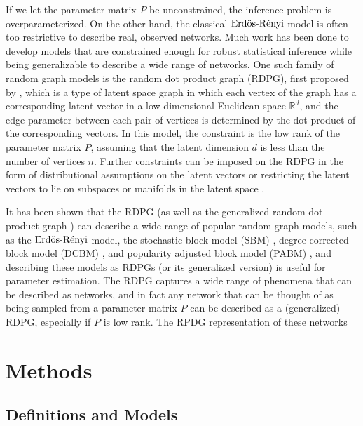 \documentclass[12pt]{article}
\begin{document}
If we let the parameter matrix \(P\) be unconstrained, the inference
problem is overparameterized. On the other hand, the classical \(\text{Erd\"{o}s-R\'{e}nyi}\)
model is often too restrictive to describe real, observed networks. Much
work has been done to develop models that are constrained enough for
robust statistical inference while being generalizable to describe a
wide range of networks. One such family of random graph models is the
random dot product graph (RDPG), first proposed by
\citet{10.1007/978-3-540-77004-6_11}, which is a type of latent space
graph in which each vertex of the graph has a corresponding latent
vector in a low-dimensional Euclidean space \(\mathbb{R}^d\), and the
edge parameter between each pair of vertices is determined by the dot
product of the corresponding vectors. In this model, the constraint is
the low rank of the parameter matrix \(P\), assuming that the latent
dimension \(d\) is less than the number of vertices \(n\). Further
constraints can be imposed on the RDPG in the form of distributional
assumptions on the latent vectors or restricting the latent vectors to
lie on subspaces or manifolds in the latent space
\citep{athreya2020estimation}.

It has been shown \citep{rubindelanchy2017statistical, Koo_2022} that
the RDPG (as well as the generalized random dot product graph
\citep{rubindelanchy2017statistical}) can describe a wide range of
popular random graph models, such as the \(\text{Erd\"{o}s-R\'{e}nyi}\) model, the stochastic
block model (SBM) \citep{doi:10.1080/0022250X.1971.9989788}, degree
corrected block model (DCBM) \citep{Karrer_2011}, and popularity
adjusted block model (PABM) \citep{307cbeb9b1be48299388437423d94bf1},
and describing these models as RDPGs (or its generalized version) is
useful for parameter estimation. The RDPG captures a wide range of
phenomena that can be described as networks, and in fact any network
that can be thought of as being sampled from a parameter matrix \(P\)
can be described as a (generalized) RDPG, especially if \(P\) is low
rank. The RPDG representation of these networks

\hypertarget{methods}{%
\section{Methods}\label{methods}}

\hypertarget{definitions-and-models}{%
\subsection{Definitions and Models}\label{definitions-and-models}}
\end{document}
